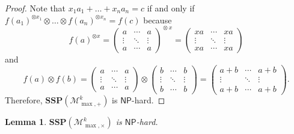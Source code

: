 \documentclass[reqno,12pt]{amsart}
\newtheorem{lemma}{Lemma}
\theoremstyle{definition}
\newcommand{\NP}{\mathsf{NP}}
\newcommand{\MP}{\mathcal{M}_{\max, {+}}^k}
\newcommand{\MT}{\mathcal{M}_{\max, {\times}}^k}
\newcommand{\SSMPP}{\mathbf{SSP}(\MP)}
\newcommand{\SSMTP}{\mathbf{SSP}(\MT)}
\begin{document}
\begin{proof}
Note that $x_1 a_1 + \ldots + x_n a_n = c$ if and only if
$f(a_1)^{\otimes x_1} \otimes \ldots \otimes f(a_n)^{\otimes x_n} = f(c)$ because
$$
f(a)^{\otimes x} = 
\begin{pmatrix}
a      & \cdots & a \\
\vdots & \ddots & \vdots \\
a      & \cdots & a      
\end{pmatrix}^{\!\!\otimes x} 
= 
\begin{pmatrix}
xa      & \cdots & xa \\
\vdots & \ddots & \vdots \\
xa      & \cdots & xa      
\end{pmatrix}
$$
and
\begin{equation*}
f(a) \otimes f(b) = 
\begin{pmatrix}
a      & \cdots & a \\
\vdots & \ddots & \vdots \\
a      & \cdots & a      
\end{pmatrix}
\otimes
\begin{pmatrix}
b      & \cdots & b \\
\vdots & \ddots & \vdots \\
b      & \cdots & b      
\end{pmatrix} 
=
\begin{pmatrix}
a+b      & \cdots & a+b \\
\vdots & \ddots & \vdots \\
a+b      & \cdots & a+b      
\end{pmatrix}.
\end{equation*}
Therefore, $\SSMPP$ is $\NP$-hard. 
\end{proof}

\begin{lemma}\label{Lemma22}
$\SSMTP$ is $\NP$-hard.
\end{lemma}
\end{document}
